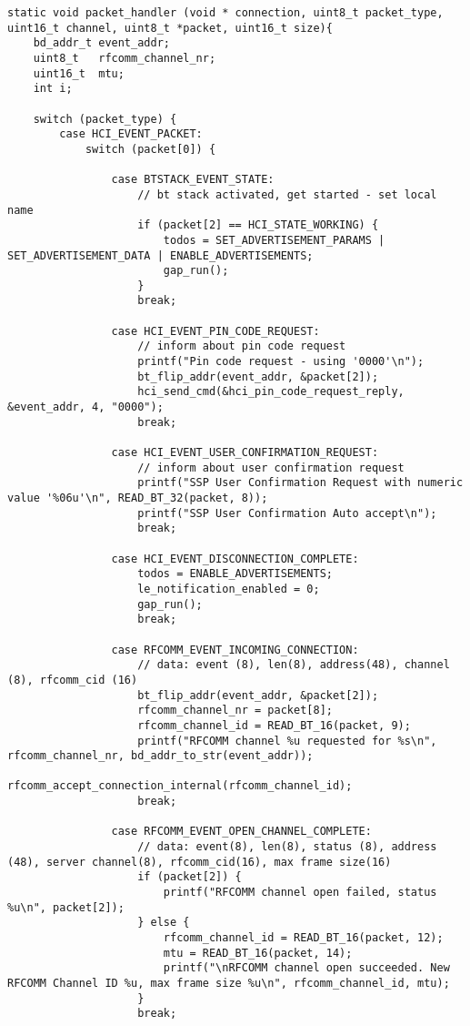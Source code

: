 \begin{lstlisting}[caption= SPP\&LE client - packet handler., label=code:spp_le_gap_run]
static void packet_handler (void * connection, uint8_t packet_type, uint16_t channel, uint8_t *packet, uint16_t size){
    bd_addr_t event_addr;
    uint8_t   rfcomm_channel_nr;
    uint16_t  mtu;
    int i;

    switch (packet_type) {
        case HCI_EVENT_PACKET:
            switch (packet[0]) {
                    
                case BTSTACK_EVENT_STATE:
                    // bt stack activated, get started - set local name
                    if (packet[2] == HCI_STATE_WORKING) {
                        todos = SET_ADVERTISEMENT_PARAMS | SET_ADVERTISEMENT_DATA | ENABLE_ADVERTISEMENTS;
                        gap_run();
                    }
                    break;
                                    
                case HCI_EVENT_PIN_CODE_REQUEST:
                    // inform about pin code request
                    printf("Pin code request - using '0000'\n");
                    bt_flip_addr(event_addr, &packet[2]);
                    hci_send_cmd(&hci_pin_code_request_reply, &event_addr, 4, "0000");
                    break;

                case HCI_EVENT_USER_CONFIRMATION_REQUEST:
                    // inform about user confirmation request
                    printf("SSP User Confirmation Request with numeric value '%06u'\n", READ_BT_32(packet, 8));
                    printf("SSP User Confirmation Auto accept\n");
                    break;

                case HCI_EVENT_DISCONNECTION_COMPLETE:
                    todos = ENABLE_ADVERTISEMENTS;
                    le_notification_enabled = 0;
                    gap_run();
                    break;

                case RFCOMM_EVENT_INCOMING_CONNECTION:
                    // data: event (8), len(8), address(48), channel (8), rfcomm_cid (16)
                    bt_flip_addr(event_addr, &packet[2]); 
                    rfcomm_channel_nr = packet[8];
                    rfcomm_channel_id = READ_BT_16(packet, 9);
                    printf("RFCOMM channel %u requested for %s\n", rfcomm_channel_nr, bd_addr_to_str(event_addr));
                    rfcomm_accept_connection_internal(rfcomm_channel_id);
                    break;
                    
                case RFCOMM_EVENT_OPEN_CHANNEL_COMPLETE:
                    // data: event(8), len(8), status (8), address (48), server channel(8), rfcomm_cid(16), max frame size(16)
                    if (packet[2]) {
                        printf("RFCOMM channel open failed, status %u\n", packet[2]);
                    } else {
                        rfcomm_channel_id = READ_BT_16(packet, 12);
                        mtu = READ_BT_16(packet, 14);
                        printf("\nRFCOMM channel open succeeded. New RFCOMM Channel ID %u, max frame size %u\n", rfcomm_channel_id, mtu);
                    }
                    break;
                    

\end{lstlisting}
